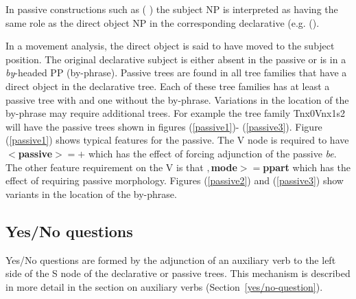 In passive constructions such as ( ) the subject NP is
interpreted as having the same role as the direct object NP in the
corresponding declarative (e.g. ().


 In a movement analysis, the direct object is said to have moved to
the subject position.  The original declarative subject is either
absent in the passive or is in a {\it by}-headed
PP (by-phrase). Passive trees are found in all tree families that have
a direct object in the declarative tree. Each of these tree families
has at least a passive tree with and one without the
by-phrase. Variations in the location of the by-phrase may require
additional trees.  For example the tree family Tnx0Vnx1s2 will have
the passive trees shown in figures (\ref{passive1})-
(\ref{passive3}). Figure (\ref{passive1}) shows typical features for
the passive. The V node is required to have {\bf $<$passive$>=+$} which
has the effect of forcing adjunction of the passive {\it be}.  The
other feature requirement on the V is that {\bf $,$mode$>=$ppart}
which has the effect of requiring passive morphology.  Figures
(\ref{passive2}) and (\ref{passive3}) show variants in the location of
the by-phrase.

 
\begin{figure}[htbp]
\end{figure}

\begin{figure}[htbp]
\end{figure}


\begin{figure}[htbp]
\end{figure}


\subsection{Yes/No questions}

Yes/No questions are formed by the adjunction of an auxiliary verb to the left
side of the S node of the declarative or passive trees.  This mechanism is
described in more detail in the section on auxiliary verbs
(Section~\ref{yes/no-question}).

